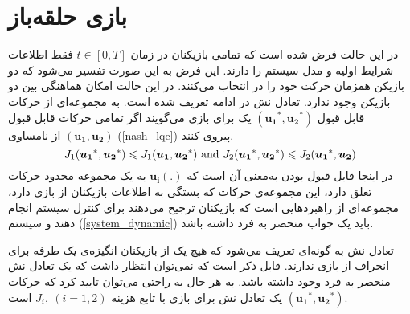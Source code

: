 \section{بازی حلقه‌باز}
در این حالت فرض شده است که تمامی بازیکنان در زمان 
$t \in [0, T]$
فقط اطلاعات شرایط اولیه و مدل سیستم را دارند. این فرض به این صورت تفسیر می‌شود که دو بازیکن همزمان حرکت خود را در انتخاب می‌کنند. در این حالت امکان هماهنگی بین دو بازیکن وجود ندارد. تعادل نش در ادامه تعریف شده ‌است.
به مجموعه‌ای از حرکات قابل قبول 
$(\boldsymbol{u_1}^*,  \boldsymbol{u_2}^*)$
یک  برای بازی می‌گویند اگر تمامی حرکات قابل قبول 
$(\boldsymbol{u_1},  \boldsymbol{u_2})$
از نامساوی (\ref{nash_lqe}) پیروی کنند.
\begin{equation}\label{nash_lqe}
	J_1(\boldsymbol{u_1}^*, \boldsymbol{u_2}^*)\leq J_1(\boldsymbol{u_1}, \boldsymbol{u_2}^*) \text{\rm{ and }}
	J_2(\boldsymbol{u_1}^*, \boldsymbol{u_2}^*)\leq 
	J_2(\boldsymbol{u_1}^*, \boldsymbol{u_2})
\end{equation}
در اینجا قابل قبول بودن به‌معنی آن است که
$\boldsymbol{u_i}(.)$
به یک مجموعه محدود حرکات تعلق دارد، این مجموعه‌ی حرکات که بستگی به اطلاعات بازیکنان از بازی دارد، مجموعه‌ای از راهبردهایی است که بازیکنان ترجیح می‌دهند برای کنترل سیستم انجام دهند و سیستم 
(\ref{system_dynamic})
باید یک جواب منحصر به فرد داشته باشد. 


تعادل نش به گونه‌ای تعریف می‌شود که هیچ یک از بازیکنان انگیزه‌ی یک طرفه برای انحراف از بازی ندارند. قابل ذکر است که نمی‌توان انتظار داشت که یک تعادل نش منحصر به فرد وجود داشته باشد. به هر حال به راحتی می‌توان تایید کرد که حرکات
$(\boldsymbol{u_1}^*, \boldsymbol{u_2}^*)$
یک تعادل نش برای بازی با تابع هزینه
$J_i,~ (i = 1, 2)$
است.


